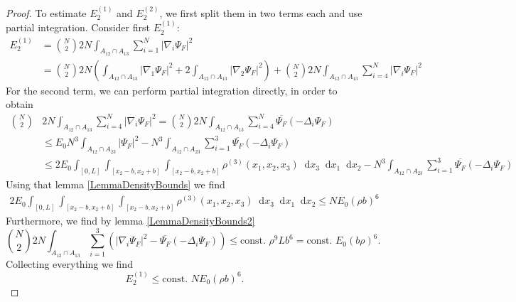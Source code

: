 \documentclass[a4paper,11pt]{article}
\newcommand{\abs}[1]{\left\lvert #1 \right\rvert}
\newcommand*\diff{\mathop{}\!\mathrm{d}}
\numberwithin{equation}{section}
\begin{document}
		\begin{proof}
		To estimate $ E_2^{(1)} $ and $ E_2^{(2)} $, we first split them in two terms each and use partial integration. Consider first $ E_2^{(1)} $: 
		\begin{equation}
		\begin{aligned}
		E_2^{(1)}&=\binom{N}{2}2N\int_{A_{12}\cap A_{13}}\sum_{i=1}^{N}\abs{\nabla_i\Psi_F}^2\\
		&=\binom{N}{2}2N\left(\int_{A_{12}\cap A_{13}}\abs{\nabla_1\Psi_F}^2+2\int_{A_{12}\cap A_{13}}\abs{\nabla_2\Psi_F}^2\right)+\binom{N}{2}2N\int_{A_{12}\cap A_{13}}\sum_{i=4}^{N}\abs{\nabla_i\Psi_F}^2
		\end{aligned}
		\end{equation}
		For the second term, we can perform partial integration directly, in order to obtain \begin{equation}
		\begin{aligned}
		\binom{N}{2}&2N\int_{A_{12}\cap A_{13}}\sum_{i=4}^{N}\abs{\nabla_i\Psi_F}^2=\binom{N}{2}2N\int_{A_{12}\cap A_{13}}\sum_{i=4}^{N}\overline{\Psi_F}(-\Delta_i\Psi_F)\\
		&\leq E_0 N^3\int_{A_{12}\cap A_{23}}\abs{\Psi_F}^2-N^3\int_{A_{12}\cap A_{23}}\sum_{i=1}^{3}\overline{\Psi_F}(-\Delta_i\Psi_F)\\&\leq 2E_0\int_{[0,L]}\int_{[x_2-b,x_2+b]}\int_{[x_2-b,x_2+b]}\rho^{(3)}(x_1,x_2,x_3)\diff x_3\diff x_1\diff x_2-N^3\int_{A_{12}\cap A_{23}}\sum_{i=1}^{3}\overline{\Psi_F}(-\Delta_i\Psi_F)
		\end{aligned}
		\end{equation}
		Using that lemma \ref{LemmaDensityBounds} we find \begin{equation}
		\begin{aligned}
		2E_0\int_{[0,L]}\int_{[x_2-b,x_2+b]}\int_{[x_2-b,x_2+b]}\rho^{(3)}(x_1,x_2,x_3)\diff x_3\diff x_1\diff x_2\leq NE_0(\rho b)^6
		\end{aligned}
		\end{equation}
		Furthermore, we find by lemma \ref{LemmaDensityBounds2} \begin{equation}
		\binom{N}{2}2N\int_{A_{12}\cap A_{13}}\sum_{i=1}^{3}\left(\abs{\nabla_i\Psi_F}^2-\overline{\Psi_F}(-\Delta_i\Psi_F)\right)\leq \text{const. }\rho^9 L b^6=\text{const. }E_0 (b\rho)^6.
		\end{equation}
		Collecting everything we find \begin{equation}
		E_2^{(1)}\leq \text{const. }NE_0(\rho b)^6.
		\end{equation}

\end{proof}
\end{document}

